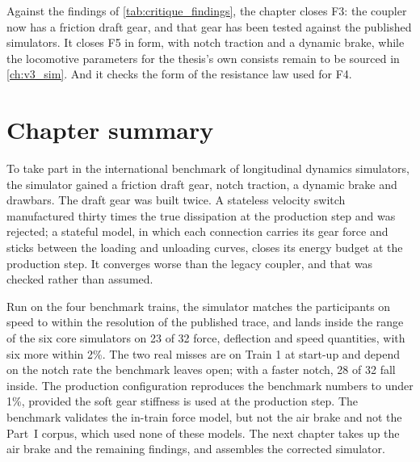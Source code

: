 Against the findings of \cref{tab:critique_findings}, the chapter closes F3: the coupler now has a friction draft gear, and that gear has been tested against the published simulators. It closes F5 in form, with notch traction and a dynamic brake, while the locomotive parameters for the thesis's own consists remain to be sourced in \cref{ch:v3_sim}. And it checks the form of the resistance law used for F4.

\section{Chapter summary}

To take part in the international benchmark of longitudinal dynamics simulators, the simulator gained a friction draft gear, notch traction, a dynamic brake and drawbars. The draft gear was built twice. A stateless velocity switch manufactured thirty times the true dissipation at the production step and was rejected; a stateful model, in which each connection carries its gear force and sticks between the loading and unloading curves, closes its energy budget at the production step. It converges worse than the legacy coupler, and that was checked rather than assumed.

Run on the four benchmark trains, the simulator matches the participants on speed to within the resolution of the published trace, and lands inside the range of the six core simulators on 23 of 32 force, deflection and speed quantities, with six more within 2\%. The two real misses are on Train 1 at start-up and depend on the notch rate the benchmark leaves open; with a faster notch, 28 of 32 fall inside. The production configuration reproduces the benchmark numbers to under 1\%, provided the soft gear stiffness is used at the production step. The benchmark validates the in-train force model, but not the air brake and not the Part~I corpus, which used none of these models. The next chapter takes up the air brake and the remaining findings, and assembles the corrected simulator.
